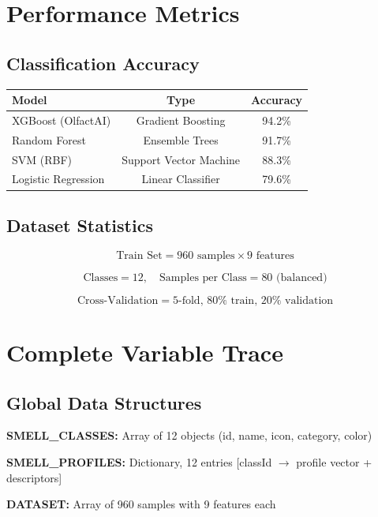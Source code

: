 \documentclass[10pt]{article}
\begin{document}
\section{Performance Metrics}

\subsection{Classification Accuracy}

\begin{table}[H]
\centering
\begin{tabular}{|l|c|c|}
\hline
\textbf{Model} & \textbf{Type} & \textbf{Accuracy} \\
\hline
XGBoost (OlfactAI) & Gradient Boosting & 94.2\% \\
Random Forest & Ensemble Trees & 91.7\% \\
SVM (RBF) & Support Vector Machine & 88.3\% \\
Logistic Regression & Linear Classifier & 79.6\% \\
\hline
\end{tabular}
\end{table}

\subsection{Dataset Statistics}

\[
\text{Train Set} = 960 \text{ samples} \times 9 \text{ features}
\]

\[
\text{Classes} = 12, \quad \text{Samples per Class} = 80 \text{ (balanced)}
\]

\[
\text{Cross-Validation} = 5\text{-fold, } 80\% \text{ train, } 20\% \text{ validation}
\]

\section{Complete Variable Trace}

\subsection{Global Data Structures}

\textbf{SMELL\_CLASSES:} Array of 12 objects (id, name, icon, category, color)

\textbf{SMELL\_PROFILES:} Dictionary, 12 entries [classId $\to$ profile vector + descriptors]

\textbf{DATASET:} Array of 960 samples with 9 features each
\end{document}
